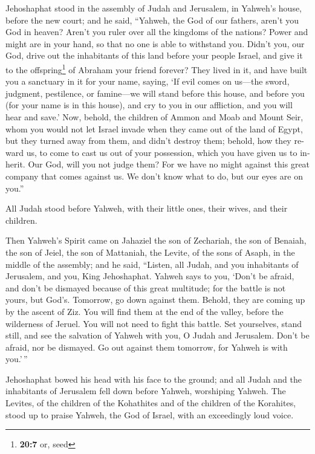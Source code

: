 \begin{paracol}{2}
\begin{otherlanguage}{english}
 Jehoshaphat stood in the assembly of Judah and Jerusalem,
in Yahweh's house, before the new court;  and he said,
``Yahweh, the God of our fathers, aren't you God in heaven? Aren't you
ruler over all the kingdoms of the nations? Power and might are in your
hand, so that no one is able to withstand you.  Didn't
you, our God, drive out the inhabitants of this land before your people
Israel, and give it to the offspring\footnote{\textbf{20:7} or, seed} of
Abraham your friend forever?  They lived in it, and have
built you a sanctuary in it for your name, saying,  `If
evil comes on us---the sword, judgment, pestilence, or famine---we will
stand before this house, and before you (for your name is in this
house), and cry to you in our affliction, and you will hear and save.'
 Now, behold, the children of Ammon and Moab and Mount
Seir, whom you would not let Israel invade when they came out of the
land of Egypt, but they turned away from them, and didn't destroy them;
 behold, how they reward us, to come to cast us out of
your possession, which you have given us to inherit.  Our
God, will you not judge them? For we have no might against this great
company that comes against us. We don't know what to do, but our eyes
are on you.''

 All Judah stood before Yahweh, with their little ones,
their wives, and their children.

 Then Yahweh's Spirit came on Jahaziel the son of
Zechariah, the son of Benaiah, the son of Jeiel, the son of Mattaniah,
the Levite, of the sons of Asaph, in the middle of the assembly;
 and he said, ``Listen, all Judah, and you inhabitants of
Jerusalem, and you, King Jehoshaphat. Yahweh says to you, `Don't be
afraid, and don't be dismayed because of this great multitude; for the
battle is not yours, but God's.  Tomorrow, go down
against them. Behold, they are coming up by the ascent of Ziz. You will
find them at the end of the valley, before the wilderness of Jeruel.
 You will not need to fight this battle. Set yourselves,
stand still, and see the salvation of Yahweh with you, O Judah and
Jerusalem. Don't be afraid, nor be dismayed. Go out against them
tomorrow, for Yahweh is with you.'\,''

 Jehoshaphat bowed his head with his face to the ground;
and all Judah and the inhabitants of Jerusalem fell down before Yahweh,
worshiping Yahweh.  The Levites, of the children of the
Kohathites and of the children of the Korahites, stood up to praise
Yahweh, the God of Israel, with an exceedingly loud voice.


\end{otherlanguage}
\end{paracol}

